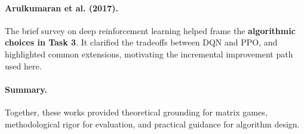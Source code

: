 \paragraph{Arulkumaran et al. (2017).}  
The brief survey on deep reinforcement learning \cite{arulkumaran2017deep}
helped frame the \textbf{algorithmic choices in Task 3}. It clarified the tradeoffs
between DQN and PPO, and highlighted common extensions, motivating the
incremental improvement path used here.

\paragraph{Summary.}  
Together, these works provided theoretical grounding for matrix games,
methodological rigor for evaluation, and practical guidance for algorithm
design.
